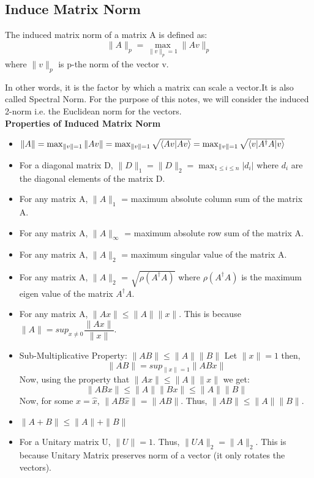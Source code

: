 \subsection{Induce Matrix Norm}
\begin{definition}
    The induced matrix norm of a matrix A is defined as:
    \[ \|A\|_p=\max_{\|v\|_p=1} \|Av\|_p \]
    where $\|v\|_p$ is p-the norm of the vector v.
\end{definition}
In other words, it is the factor by which a matrix can scale a vector.It is 
also called Spectral Norm. For the purpose of this notes, we will consider the
induced 2-norm i.e. the Euclidean norm for the vectors.\\
\textbf{Properties of Induced Matrix Norm}
\begin{itemize}
    \item $\|A\|=\max_{\|v\|=1} \|Av\|=\max_{\|v\|=1} \sqrt{\braket{Av|Av}}=\max_{\|v\|=1} \sqrt{\braket{v|A^{\dagger}A|v}}$
    \item For a diagonal matrix D, $\|D\|_1 = \|D\|_2=\max_{1\leq i \leq n} |d_i|$ where $d_i$ are the diagonal elements of the matrix D.
    \item For any matrix A, $\|A\|_1$ = maximum absolute column sum of the matrix A.
    \item For any matrix A, $\|A\|_{\infty}$ = maximum absolute row sum of the matrix A.
    \item For any matrix A, $\|A\|_2$ = maximum singular value of the matrix A.
    \item For any matrix A, $\|A\|_2$ = $\sqrt{\rho(A^{\dagger}A)}$ where $\rho(A^{\dagger}A)$ is the maximum eigen value of the matrix $A^{\dagger}A$.
    \item For any matrix A, $\|Ax\|\leq \|A\|\|x\|$. This is because $\|A\| =sup_{x\neq 0} \dfrac{\|Ax\|}{\|x\|}$.
    \item Sub-Multiplicative Property: $\|AB\|\leq \|A\|\|B\|$
    Let $\|x\|=1$ then,
    \[ \|AB\|=sup_{\|x\|=1} \|ABx\|\]
    Now, using the property that $\|Ax\|\leq \|A\|\|x\|$ we get:
    \[ \|ABx\| \leq \|A\|\|Bx\| \leq \|A\|\|B\| \]
    Now, for some $x=\hat{x}$, $\|AB\hat{x}\|=\|AB\|$.
    Thus, $\|AB\|\leq \|A\|\|B\|$.
    \item $\|A+B\|\leq \|A\|+\|B\|$
    \item For a Unitary matrix U, $\|U\|=1$. Thus, $\|UA\|_2=\|A\|_2$. This is because Unitary Matrix preserves norm of a vector (it only rotates the vectors).
\end{itemize}

